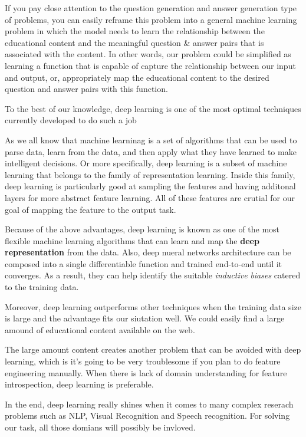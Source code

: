 \documentclass[]{book}
\theoremstyle{definition}
\theoremstyle{definition}
\theoremstyle{definition}
\theoremstyle{remark}
\begin{document}
If you pay close attention to the question generation and answer
generation type of problems, you can easily reframe this problem into a
general machine learning problem in which the model needs to learn the
relationship between the educational content and the meaningful question
\& answer pairs that is associated with the content. In other words, our
problem could be simplified as learning a function that is capable of
capture the relationship between our input and output, or, appropriately
map the educational content to the desired question and answer pairs
with this function.

To the best of our knowledge, deep learning is one of the most optimal
techniques currently developed to do such a job

As we all know that machine learninag is a set of algorithms that can be
used to parse data, learn from the data, and then apply what they have
learned to make intelligent decisions. Or more specifically, deep
learning is a subset of machine learning that belongs to the family of
representation learning. Inside this family, deep learning is
particularly good at sampling the features and having additonal layers
for more abstract feature learning. All of these features are crutial
for our goal of mapping the feature to the output task.

Because of the above advantages, deep learning is known as one of the
most flexible machine learning algorithms that can learn and map the
\textbf{deep representation} from the data. Also, deep nueral networks
architecture can be composed into a single differentiable function and
trained end-to-end until it converges. As a result, they can help
identify the suitable \emph{inductive} \emph{biases} catered to the
training data.

Moreover, deep learning outperforms other techniques when the training
data size is large and the advantage fits our siutation well. We could
easily find a large amound of educational content available on the web.

The large amount content creates another problem that can be avoided
with deep learning, which is it's going to be very troublesome if you
plan to do feature engineering manually. When there is lack of domain
understanding for feature introspection, deep learning is preferable.

In the end, deep learning really shines when it comes to many complex
reserach problems such as NLP, Visual Recognition and Speech
recognition. For solving our task, all those domians will possibly be
invloved.
\end{document}
